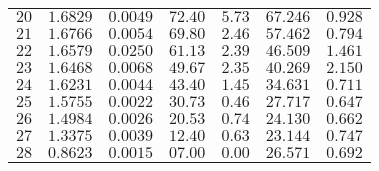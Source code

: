 \documentclass[12pt,a4]{article}
\begin{document}
\begin{table}[h]
\begin{tabular}{c | c | c | c | c | c | c }
$ 20 $&$ 1.6829 $&$ 0.0049 $&$ 72.40 $&$ 5.73 $&$ 67.246 $&$ 0.928 $\\
$ 21 $&$ 1.6766 $&$ 0.0054 $&$ 69.80 $&$ 2.46 $&$ 57.462 $&$ 0.794 $\\
$ 22 $&$ 1.6579 $&$ 0.0250 $&$ 61.13 $&$ 2.39 $&$ 46.509 $&$ 1.461 $\\
$ 23 $&$ 1.6468 $&$ 0.0068 $&$ 49.67 $&$ 2.35 $&$ 40.269 $&$ 2.150 $\\
$ 24 $&$ 1.6231 $&$ 0.0044 $&$ 43.40 $&$ 1.45 $&$ 34.631 $&$ 0.711 $\\
$ 25 $&$ 1.5755 $&$ 0.0022 $&$ 30.73 $&$ 0.46 $&$ 27.717 $&$ 0.647 $\\
$ 26 $&$ 1.4984 $&$ 0.0026 $&$ 20.53 $&$ 0.74 $&$ 24.130 $&$ 0.662 $\\
$ 27 $&$ 1.3375 $&$ 0.0039 $&$ 12.40 $&$ 0.63 $&$ 23.144 $&$ 0.747 $\\
$ 28 $&$ 0.8623 $&$ 0.0015 $&$ 07.00 $&$ 0.00 $&$ 26.571 $&$ 0.692 $\\
\end{tabular}
\end{table}
\end{document}
